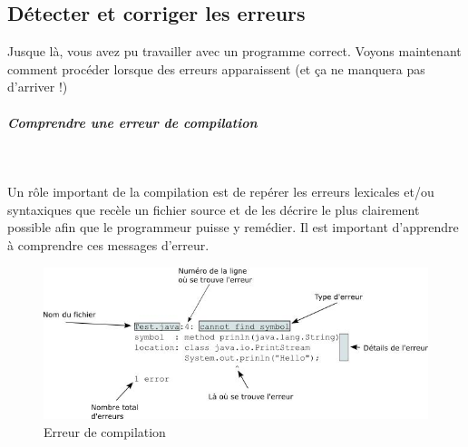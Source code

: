 \documentclass[a4paper,11pt]{article}
\begin{document}
			
%		
%				
%        
%				

	\subsection{D\'etecter et corriger les erreurs}  
          	Jusque l\`a, vous avez pu travailler avec un programme correct. Voyons maintenant comment proc\'eder lorsque des erreurs apparaissent 
		(et \c ca ne manquera pas d'arriver !)   
        
            	\par
        
			
		\subparagraph{Comprendre une erreur de compilation} 
		
			\textcolor{white}{.} \par
          		Un r\^ole important de la compilation est de rep\'erer les erreurs lexicales et/ou syntaxiques que rec\`ele un fichier source 
         		 et de les d\'ecrire le plus clairement possible afin que le programmeur puisse y rem\'edier. 
         		 Il est important d'apprendre \`a comprendre ces messages d'erreur.   
        
            		\par
		
        			\begin{figure}[hbt]
				\begin{center}
					\includegraphics[width=0.8\linewidth,height=0.8\textheight,keepaspectratio=true]{image/ErreurCompil.jpg}
				\end{center}
                
                   		 \caption[Erreur de compilation]{Erreur de compilation}
               		 \end{figure}
                    
\end{document}
